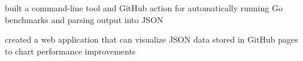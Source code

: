 \begin{cventries}
    {} %
    {} %
    {
      \begin{cvitems} %
        \item {built a command-line tool and GitHub action for automatically running Go benchmarks and parsing output into JSON}
        \item {created a web application that can visualize JSON data stored in GitHub pages to chart performance improvements}
      \end{cvitems}
    }
\fi
\iffalse
  \cventry
    {Fast, insightful, and highly customizable git history analysis} %
    {Hercules | Contributor} %
    {\linktext{github.com/src-d/hercules}} %
    {} %
    {
      \begin{cvitems} %
        \item {Enabled higher granularity by rewriting core parts of the tool's internal directed acyclic graph of analysis jobs}
      \end{cvitems}
    }
\fi
\end{cventries}
